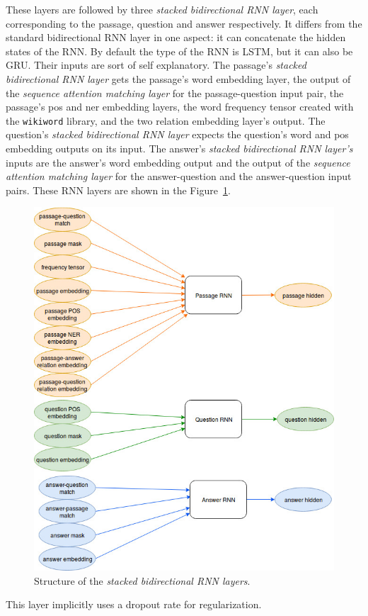 These layers are followed by three \textit{stacked bidirectional RNN layer}, each corresponding to the passage, question and answer respectively. It differs from the standard bidirectional RNN layer in one aspect: it can concatenate the hidden states of the RNN. By default the type of the RNN is LSTM, but it can also be GRU. Their inputs are sort of self explanatory. The passage's \textit{stacked bidirectional RNN layer} gets the passage's word embedding layer, the output of the \textit{sequence attention matching layer} for the passage-question input pair, the passage's pos and ner embedding layers, the word frequency tensor created with the \texttt{wikiword} library, and the two relation embedding layer's output. The question's \textit{stacked bidirectional RNN layer} expects the question's word and pos embedding outputs on its input. The answer's \textit{stacked bidirectional RNN layer's} inputs are the answer's word embedding output and  the output of the \textit{sequence attention matching layer} for the answer-question and the answer-question input pairs. These RNN layers are shown in the Figure~\ref{fig:rnn}.
\begin{figure}[h!]
	\centering
	\includegraphics[scale=0.25]{TriAN_rnn.jpg}
	\caption{Structure of the \textit{stacked bidirectional RNN layers}.}
	\label{fig:rnn}
\end{figure}
This layer implicitly uses a dropout rate for regularization.

